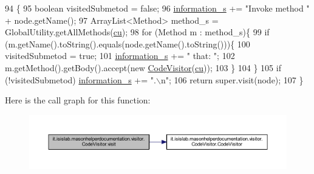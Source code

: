 \begin{DoxyCode}
94                                                 \{
95         \textcolor{keywordtype}{boolean} visitedSubmetod = \textcolor{keyword}{false};
96         \hyperlink{classit_1_1isislab_1_1masonhelperdocumentation_1_1visitor_1_1_code_visitor_a8bfc263e47218ff87b62a5ad9b1294e7}{information\_s} += \textcolor{stringliteral}{"Invoke method "} + node.getName();
97         ArrayList<Method> method\_s = GlobalUtility.getAllMethods(\hyperlink{classit_1_1isislab_1_1masonhelperdocumentation_1_1visitor_1_1_code_visitor_af9088f73f92fd3640698ad4e660f042b}{cu});
98         \textcolor{keywordflow}{for} (Method m : method\_s)\{
99             \textcolor{keywordflow}{if} (m.getName().toString().equals(node.getName().toString()))\{
100                 visitedSubmetod = \textcolor{keyword}{true};
101                 \hyperlink{classit_1_1isislab_1_1masonhelperdocumentation_1_1visitor_1_1_code_visitor_a8bfc263e47218ff87b62a5ad9b1294e7}{information\_s} += \textcolor{stringliteral}{" that: "};
102                 m.getMethod().getBody().accept(\textcolor{keyword}{new} \hyperlink{classit_1_1isislab_1_1masonhelperdocumentation_1_1visitor_1_1_code_visitor_a187184161108b27007b877d0c2370443}{CodeVisitor}(\hyperlink{classit_1_1isislab_1_1masonhelperdocumentation_1_1visitor_1_1_code_visitor_af9088f73f92fd3640698ad4e660f042b}{cu}));
103             \}
104         \}
105         \textcolor{keywordflow}{if} (!visitedSubmetod) \hyperlink{classit_1_1isislab_1_1masonhelperdocumentation_1_1visitor_1_1_code_visitor_a8bfc263e47218ff87b62a5ad9b1294e7}{information\_s} += \textcolor{stringliteral}{".\(\backslash\)n"};
106         \textcolor{keywordflow}{return} super.visit(node);
107     \}
\end{DoxyCode}


Here is the call graph for this function\-:
\nopagebreak
\begin{figure}[H]
\begin{center}
\leavevmode
\includegraphics[width=350pt]{classit_1_1isislab_1_1masonhelperdocumentation_1_1visitor_1_1_code_visitor_a217f515da74b716c9d3fb43027be8301_cgraph}
\end{center}
\end{figure}




